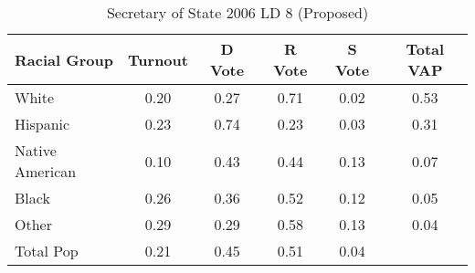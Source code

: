 \begin{table}[htb]
\begin{center}
\caption{Secretary of State 2006 LD 8 (Proposed)}
\label{sos06_vap_ld_8}
\begin{tabular}{lccccc}
  \hline
Racial Group & Turnout & D Vote & R Vote & S Vote & Total VAP \\ 
  \hline
White & 0.20 & 0.27 & 0.71 & 0.02 & 0.53 \\ 
  Hispanic & 0.23 & 0.74 & 0.23 & 0.03 & 0.31 \\ 
  Native American & 0.10 & 0.43 & 0.44 & 0.13 & 0.07 \\ 
  Black & 0.26 & 0.36 & 0.52 & 0.12 & 0.05 \\ 
  Other & 0.29 & 0.29 & 0.58 & 0.13 & 0.04 \\ 
  Total Pop & 0.21 & 0.45 & 0.51 & 0.04 &  \\ 
   \hline
\end{tabular}
\end{center}
\end{table}
